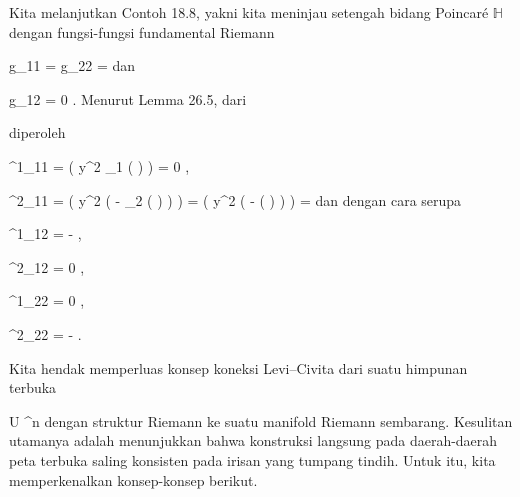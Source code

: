 {

Kita melanjutkan
Contoh 18.8,
yakni kita meninjau setengah bidang Poincaré $\mathbb H$ dengan fungsi-fungsi fundamental Riemann

\mavergleichskette
{\vergleichskette
{ g_{11}
}
{ = }{ g_{22}
}
{ = }{ {  }
}
{    }{
}
{   }{
}
}
{}{}{}
dan

\mavergleichskette
{\vergleichskette
{ g_{12}
}
{ = }{ 0
}
{  }{
}
{    }{
}
{   }{
}
}
{}{}{.}
Menurut
Lemma 26.5,
dari

 {  }

diperoleh

\mavergleichskettedisp
{\vergleichskette
{ \Gamma^1_{11}
}
{ =} { {  }  \left(  y^2  \partial_1  \left(  \right)     \right)
}
{ =} { 0
}
{ } {
}
{ } {}
}
{}{}{,}

\mavergleichskettedisp
{\vergleichskette
{ \Gamma^2_{11}
}
{ =} { {  }  \left(  y^2 \left(  - \partial_2  \left(  \right)  \right)      \right)
}
{ =} { {  }  \left(  y^2 \left(  -  \left(  \right)  \right)      \right)
}
{ =} { {  }
}
{ } {
}
}
{}{}{}
dan dengan cara serupa

\mavergleichskette
{\vergleichskette
{ \Gamma^1_{12}
}
{ = }{ - {  }
}
{  }{
}
{    }{
}
{   }{
}
}
{}{}{,}

\mavergleichskette
{\vergleichskette
{ \Gamma^2_{12}
}
{ = }{ 0
}
{  }{
}
{    }{
}
{   }{
}
}
{}{}{,}

\mavergleichskette
{\vergleichskette
{ \Gamma^1_{22}
}
{ = }{ 0
}
{  }{
}
{    }{
}
{   }{
}
}
{}{}{,}

\mavergleichskette
{\vergleichskette
{ \Gamma^2_{22}
}
{ = }{ - {  }
}
{  }{
}
{    }{
}
{   }{
}
}
{}{}{.}

}


Kita hendak memperluas konsep koneksi Levi--Civita dari suatu himpunan terbuka

\mavergleichskette
{\vergleichskette
{ U
}
{ \subseteq }{ \R^n
}
{  }{
}
{    }{
}
{   }{
}
}
{}{}{}
dengan struktur Riemann ke suatu manifold Riemann sembarang. Kesulitan utamanya adalah menunjukkan bahwa konstruksi langsung pada daerah-daerah peta terbuka saling konsisten pada irisan yang tumpang tindih. Untuk itu, kita memperkenalkan konsep-konsep berikut.

